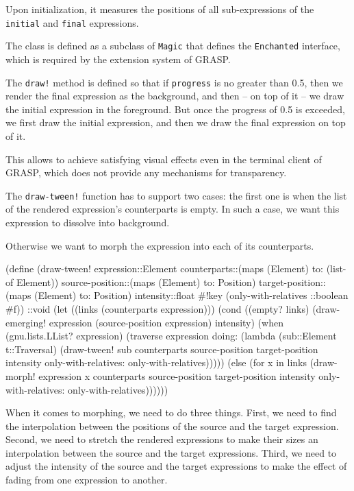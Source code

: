 \documentclass[acmsmall]{acmart}
\newenvironment{Snippet}{\Verbatim[samepage=true]}{\endVerbatim}
\begin{document}
Upon initialization, it measures the positions of all sub-expressions
of the \texttt{initial} and \texttt{final} expressions.

The class is defined as a subclass of \texttt{Magic} that defines the
\texttt{Enchanted} interface, which is required by the extension
system of GRASP.

The \texttt{draw!} method is defined so that if \texttt{progress} is
no greater than 0.5, then we render the final expression as the
background, and then -- on top of it -- we draw the initial expression
in the foreground.  But once the progress of 0.5 is exceeded, we first
draw the initial expression, and then we draw the final expression on
top of it.

This allows to achieve satisfying visual effects even in the terminal
client of GRASP, which does not provide any mechanisms for
transparency.

The \texttt{draw-tween!} function has to support two cases: the first
one is when the list of the rendered expression's counterparts is
empty. In such a case, we want this expression to dissolve into
background.

Otherwise we want to morph the expression into each of its counterparts.

\begin{Snippet}
(define (draw-tween! expression::Element
		     counterparts::(maps (Element) to: (list-of Element))
		     source-position::(maps (Element) to: Position)
		     target-position::(maps (Element) to: Position)
		     intensity::float
		     #!key (only-with-relatives ::boolean #f))
  ::void
\end{Snippet}
\begin{Snippet}
  (let ((links (counterparts expression)))
    (cond
     ((empty? links)
      (draw-emerging! expression (source-position expression) intensity)
      (when (gnu.lists.LList? expression)
        (traverse
         expression
         doing:
         (lambda (sub::Element t::Traversal)
	   (draw-tween! sub counterparts source-position target-position
	                intensity only-with-relatives: only-with-relatives)))))
\end{Snippet}
\begin{Snippet}
    (else
     (for x in links
       (draw-morph! expression x counterparts source-position target-position
		    intensity only-with-relatives: only-with-relatives))))))
\end{Snippet}

When it comes to morphing, we need to do three things. First, we need
to find the interpolation between the positions of the source and the
target expression. Second, we need to stretch the rendered expressions
to make their sizes an interpolation between the source and the target
expressions.  Third, we need to adjust the intensity of the source and
the target expressions to make the effect of fading from one
expression to another.
\end{document}
